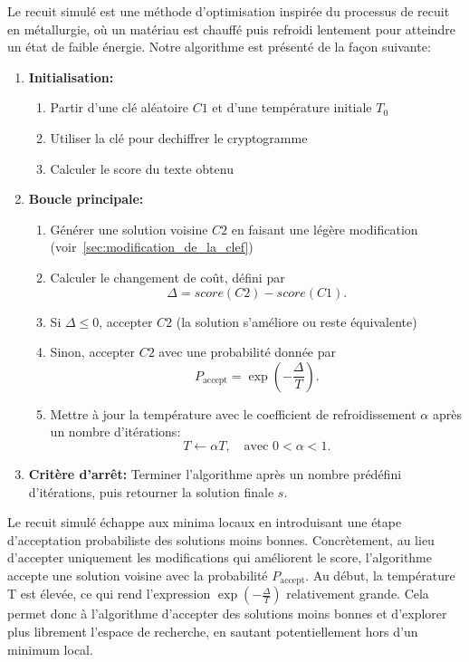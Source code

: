 \documentclass[a4paper]{article}
\begin{document}
Le recuit simulé est une méthode d’optimisation inspirée du processus de recuit en métallurgie, où un matériau est chauffé puis refroidi lentement pour atteindre un état de faible énergie.
Notre algorithme est présenté de la façon suivante:
\begin{enumerate}
    \item \textbf{Initialisation:} 
    \begin{enumerate}
        \item Partir d'une clé aléatoire $C1$ et d'une température initiale $T_0$
        \item Utiliser la clé pour dechiffrer le cryptogramme
        \item Calculer le score du texte obtenu
    \end{enumerate}
    \item \textbf{Boucle principale:}
    \begin{enumerate}[label= (\alph*)]
        \item Générer une solution voisine $C2$ en faisant une légère modification (voir~\ref{sec:modification_de_la_clef})
        \item Calculer le changement de coût, défini par
        \[
            \Delta = score(C2) - score(C1).
        \]
        \item Si $\Delta \leq 0$, accepter $C2$ (la solution s'améliore ou reste équivalente)
        \item Sinon, accepter $C2$ avec une probabilité donnée par
        \[
            P_{\text{accept}} = \exp\left(-\frac{\Delta}{T}\right).
        \]
        \item Mettre à jour la température avec le coefficient de refroidissement $\alpha$ après un nombre d'itérations:
        \[
            T \leftarrow \alpha T, \quad \text{avec } 0 < \alpha < 1.
        \]
    \end{enumerate}
    
    \item \textbf{Critère d'arrêt:} Terminer l'algorithme après un nombre prédéfini d'itérations, puis retourner la solution finale $s$.
\end{enumerate}

Le recuit simulé échappe aux minima locaux en introduisant une étape d'acceptation probabiliste des solutions moins bonnes. Concrètement, au lieu d'accepter uniquement les modifications qui améliorent le score, l'algorithme accepte une solution voisine avec la probabilité $P_{\text{accept}}$.
Au début, la température T est élevée, ce qui rend l'expression $\exp\left(-\frac{\Delta}{T}\right)$ relativement grande. Cela permet donc à l'algorithme d'accepter des solutions moins bonnes et d'explorer plus librement l'espace de recherche, en sautant potentiellement hors d'un minimum local.
\end{document}
